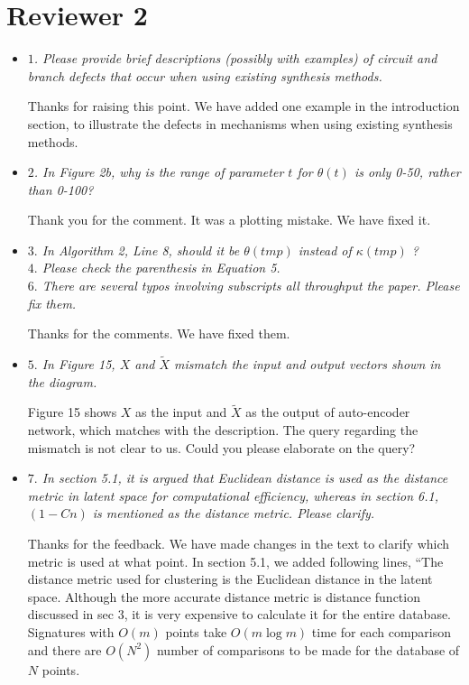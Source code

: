 \documentclass{article}
\begin{document}
\section{Reviewer 2}

\begin{itemize}
  \item \emph{
$1$. Please provide brief descriptions (possibly with examples) of circuit and branch defects that
occur when using existing synthesis methods.
}

Thanks for raising this point.
We have added one example in the introduction section, to illustrate the defects in mechanisms when using existing synthesis methods.
\\

  \item \emph{
  $2$. In Figure 2b, why is the range of parameter $t$ for $\theta(t)$ is only 0-50, rather than 0-100?
}

Thank you for the comment. It was a plotting mistake. We have fixed it.
\\

  \item \emph{
$3.$ In Algorithm 2, Line 8, should it be $\theta(tmp)$ instead of $\kappa(tmp)$ ?\\
$4.$ Please check the parenthesis in Equation 5.\\
$6.$ There are several typos involving subscripts all throughput the paper. Please fix them.
}

Thanks for the comments. We have fixed them.
\\

  \item \emph{
$5.$ In Figure 15, $X$ and $\tilde{X}$ mismatch the input and output vectors shown in the diagram.
}

Figure 15 shows $X$ as the input and $\tilde{X}$ as the output of auto-encoder network, which matches with the description.
The query regarding the mismatch is not clear to us.
Could you please elaborate on the query?
\\


  \item \emph{
$7.$ In section 5.1, it is argued that Euclidean distance is used as the distance metric in latent space for
computational efficiency, whereas in section 6.1, $(1 − Cn)$ is mentioned as the distance
metric. Please clarify.
}

Thanks for the feedback. We have made changes in the text to clarify which metric is used at what point.
In section 5.1, we added following lines, ``The distance metric used for clustering is the Euclidean distance in the latent space.
Although the more accurate distance metric is distance function discussed in sec 3, it is very expensive to calculate it for the entire database.
Signatures with ${O}(m)$ points take ${O}(m\log{}m)$ time for each comparison and there are ${O}(N^2)$ number of comparisons to be made for the database of $N$ points.


\end{itemize}
\end{document}
